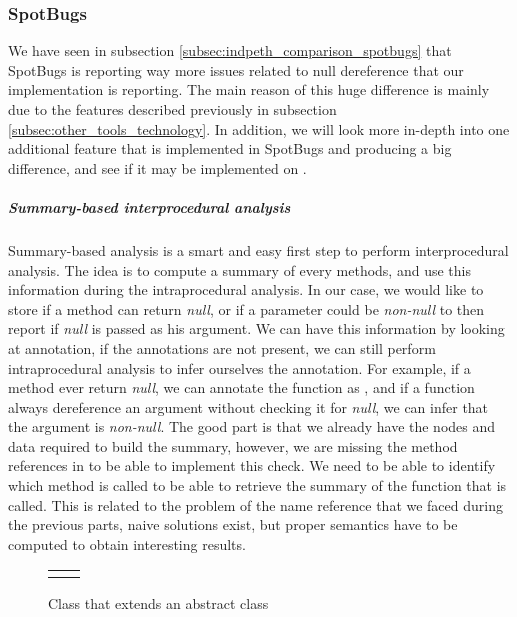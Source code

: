 \subsubsection{SpotBugs}
\label{subsec:spotbugs_specific}

We have seen in subsection \ref{subsec:indpeth_comparison_spotbugs} that SpotBugs is reporting way more issues related to null dereference that our implementation is reporting.
The main reason of this huge difference is mainly due to the features described previously in subsection \ref{subsec:other_tools_technology}.
In addition, we will look more in-depth into one additional feature that is implemented in SpotBugs and producing a big difference, and see if it may be implemented on \slang{}.

\subparagraph{Summary-based interprocedural analysis}
Summary-based analysis is a smart and easy first step to perform interprocedural analysis.
The idea is to compute a summary of every methods, and use this information during the intraprocedural analysis. 
In our case, we would like to store if a method can return \emph{null}, or if a parameter could be \emph{non-null} to then report if \emph{null} is passed as his argument.
We can have this information by looking at annotation, if the annotations are not present, we can still perform intraprocedural analysis to infer ourselves the annotation. 
For example, if a method ever return \emph{null}, we can annotate the function as \nullable{}, and if a function always dereference an argument without checking it for \emph{null}, we can infer that the argument is \emph{non-null}. 
The good part is that we already have the nodes and data required to build the summary, however, we are missing the method references in \slang{} to be able to implement this check.
We need to be able to identify which method is called to be able to retrieve the summary of the function that is called.
This is related to the problem of the name reference that we faced during the previous parts, naive solutions exist, but proper semantics have to be computed to obtain interesting results.

\begin{figure}[H]
	\centering
	\caption{Class that extends an abstract class}
	\label{figure:class-extends-abtract}
	\setlength{\tabcolsep}{24pt}
	\begin{tabular}{cc}
		\multicolumn{1}{c}{} & \multicolumn{1}{c}{} \\
	\end{tabular}


\end{figure}

